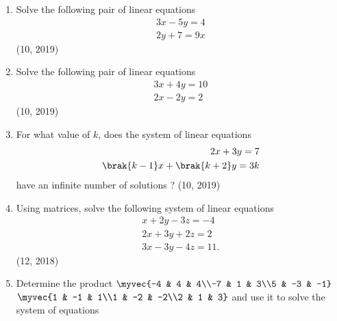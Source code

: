 \begin{enumerate}[label=\thesubsection.\arabic*,ref=\thesubsection.\theenumi]
\item Solve the following pair of linear equations 
\begin{align*}
 3x - 5y = 4\\
2y + 7 = 9x   
\end{align*}    
\hfill (10, 2019)

\item Solve the following pair of linear equations 
\begin{align*}
 3x + 4y = 10\\
2x - 2y = 2   
\end{align*}    
\hfill (10, 2019)
\item For what value of $k$, does the system of linear equations
\begin{align*}
   2x + 3y = 7\\
 \brak{k - 1} x + \brak{k + 2} y = 3k
\end{align*}
have an infinite number of solutions ?
\hfill (10, 2019)
\item Using matrices, solve the following system of linear equations 
	\begin{align*}
		x+2y-3z=-4\\
		2x+3y+2z=2\\
		3x-3y-4z=11.
	\end{align*}
\hfill (12, 2018)
\item Determine the product	$\myvec{-4 & 4 & 4\\-7 & 1 & 3\\5 & -3 & -1}$ $\myvec{1 & -1 &  1\\1 & -2 & -2\\2 &  1 &  3}$ and use it to solve the system of equations 


\end{enumerate}

